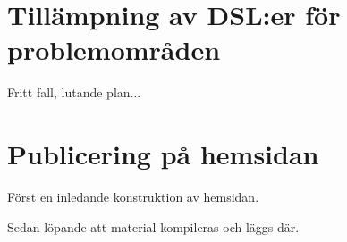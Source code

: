 \begin{binge}

\section{Tillämpning av DSL:er för problemområden}

Fritt fall, lutande plan...

\section{Publicering på hemsidan}

Först en inledande konstruktion av hemsidan.

Sedan löpande att material kompileras och läggs där.

\end{binge}
